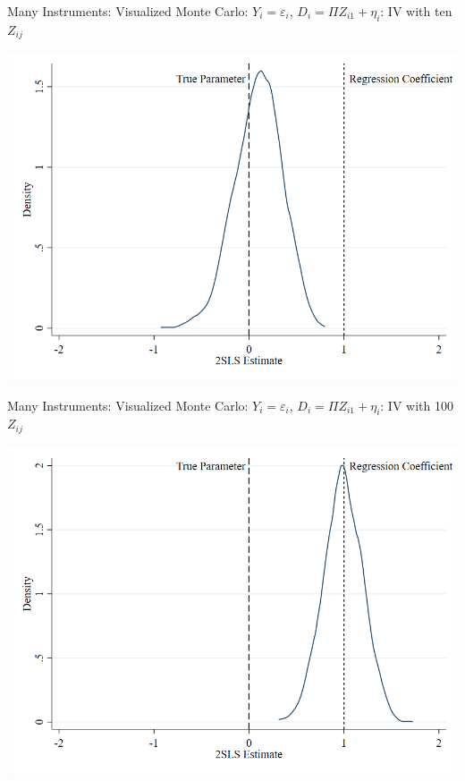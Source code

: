 \documentclass{beamer}
\begin{document}
\begin{frame}{Many Instruments: Visualized}
\vspace{-0.2cm}
Monte Carlo: $Y_i=\varepsilon_i$, $D_i=\Pi Z_{i1}+\eta_i$: IV with ten $Z_{ij}$
\begin{center}
\includegraphics[scale=0.35]{./lecture_includes/somez.png}
\end{center}

\end{frame}

\begin{frame}{Many Instruments: Visualized}
\vspace{-0.2cm}
Monte Carlo: $Y_i=\varepsilon_i$, $D_i=\Pi Z_{i1}+\eta_i$: IV with 100 $Z_{ij}$
\begin{center}
\includegraphics[scale=0.35]{./lecture_includes/manyz.png}
\end{center}

\end{frame}
\end{document}

